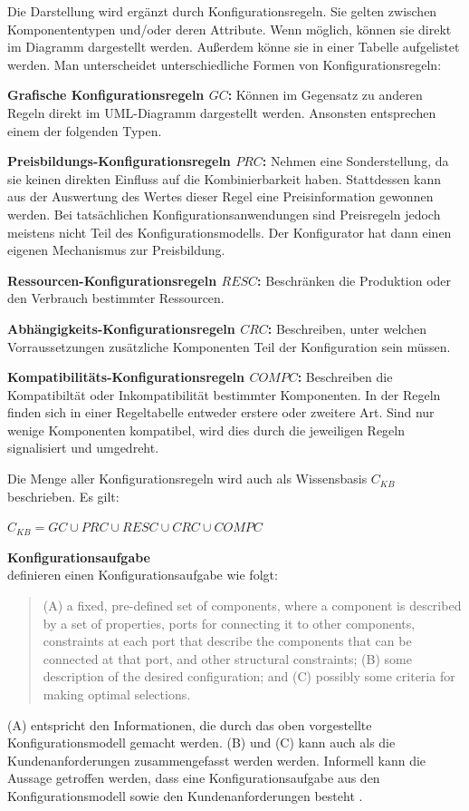 \documentclass[12pt,a4paper,bibliography=totocnumbered,listof=totoc]{scrartcl}
\begin{document}
Die Darstellung wird ergänzt durch Konfigurationsregeln. Sie gelten zwischen Komponententypen und/oder deren Attribute. Wenn möglich, können sie direkt im Diagramm dargestellt werden. Außerdem könne sie in einer Tabelle aufgelistet werden. Man unterscheidet unterschiedliche Formen von Konfigurationsregeln:

\begin{compactitem}
\item \textbf{Grafische Konfigurationsregeln $GC$:} Können im Gegensatz zu anderen Regeln direkt im UML-Diagramm dargestellt werden. Ansonsten entsprechen einem der folgenden Typen.
\item \textbf{Preisbildungs-Konfigurationsregeln $PRC$:} Nehmen eine Sonderstellung, da sie keinen direkten Einfluss auf die Kombinierbarkeit haben. Stattdessen kann aus der Auswertung des Wertes dieser Regel eine Preisinformation gewonnen werden. Bei tatsächlichen Konfigurationsanwendungen sind Preisregeln jedoch meistens nicht Teil des Konfigurationsmodells. Der Konfigurator hat dann einen eigenen Mechanismus zur Preisbildung.
\item \textbf{Ressourcen-Konfigurationsregeln $RESC$:} Beschränken die Produktion oder den Verbrauch bestimmter Ressourcen.
\item \textbf{Abhängigkeits-Konfigurationsregeln $CRC$:} Beschreiben, unter welchen Vorraussetzungen zusätzliche Komponenten Teil der Konfiguration sein müssen.
\item \textbf{Kompatibilitäts-Konfigurationsregeln $COMPC$:} Beschreiben die Kompatibiltät  oder Inkompatibilität bestimmter Komponenten. In der Regeln finden sich in einer Regeltabelle entweder erstere oder zweitere Art. Sind nur wenige Komponenten kompatibel, wird dies durch die jeweiligen Regeln signalisiert und umgedreht.
\end{compactitem}

Die Menge aller Konfigurationsregeln wird auch als Wissensbasis $C_{KB}$ beschrieben. Es gilt:

 $C_{KB} = GC \cup PRC \cup RESC \cup CRC \cup COMPC$

\textbf{Konfigurationsaufgabe}\\
\citet{mittal89} definieren einen Konfigurationsaufgabe wie folgt:
\begin{quote}
(A) a fixed, pre-defined set of components, where a component is described by a set of properties, ports for connecting it to other components, constraints at each port that describe the components that can be connected at that port, and other structural constraints; (B) some description of the desired configuration; and (C) possibly some criteria for making optimal selections.
\end{quote}
(A) entspricht den Informationen, die durch das oben vorgestellte Konfigurationsmodell gemacht werden. (B) und (C) kann auch als die Kundenanforderungen zusammengefasst werden werden. Informell kann die Aussage getroffen werden, dass eine Konfigurationsaufgabe aus den Konfigurationsmodell sowie den Kundenanforderungen besteht \citep{felferning14}.
\end{document}
